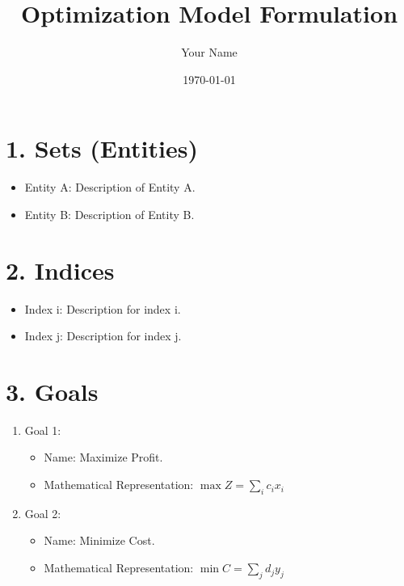 \documentclass[a4paper,12pt]{article}
\title{Optimization Model Formulation}
\author{Your Name}
\date{\today}
\begin{document}
\maketitle

\tableofcontents
\newpage

\section{1. Sets (Entities)}
\begin{itemize}[noitemsep]
    \item Entity A: Description of Entity A.
    \item Entity B: Description of Entity B.
\end{itemize}

\section{2. Indices}
\begin{itemize}[noitemsep]
    \item Index i: Description for index i.
    \item Index j: Description for index j.
\end{itemize}

\section{3. Goals}
\begin{enumerate}[label=\arabic*.]
    \item Goal 1:
    \begin{itemize}[noitemsep]
        \item Name: Maximize Profit.
        \item Mathematical Representation: \( \max Z = \sum_{i} c_i x_i \)
    \end{itemize}
    
    \item Goal 2:
    \begin{itemize}[noitemsep]
        \item Name: Minimize Cost.
        \item Mathematical Representation: \( \min C = \sum_{j} d_j y_j \)
    \end{itemize}
\end{enumerate}
\end{document}
